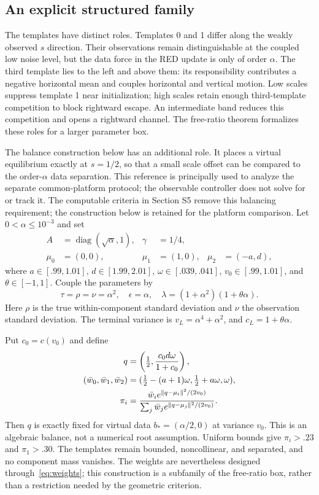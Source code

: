 \subsection{An explicit structured family}
The templates have distinct roles. Templates 0 and 1 differ along the weakly observed $s$ direction. Their observations remain distinguishable at the coupled low noise level, but the data force in the RED update is only of order $\alpha$. The third template lies to the left and above them: its responsibility contributes a negative horizontal mean and couples horizontal and vertical motion. Low scales suppress template 1 near initialization; high scales retain enough third-template competition to block rightward escape. An intermediate band reduces this competition and opens a rightward channel. The free-ratio theorem formalizes these roles for a larger parameter box.

The balance construction below has an additional role. It places a virtual equilibrium exactly at $s=1/2$, so that a small scale offset can be compared to the order-$\alpha$ data separation. This reference is principally used to analyze the separate common-platform protocol; the observable controller does not solve for or track it. The computable criteria in Section S5 remove this balancing requirement; the construction below is retained for the platform comparison.
Let $0<\alpha\le10^{-3}$ and set
\begin{align}
A&=\operatorname{diag}(\sqrt\alpha,1),&\gamma&=1/4,\\
\mu_0&=(0,0),&\mu_1&=(1,0),&\mu_2&=(-a,d),
\end{align}
where $a\in[.99,1.01]$, $d\in[1.99,2.01]$, $\omega\in[.039,.041]$, $v_0\in[.99,1.01]$, and $\theta\in[-1,1]$. Couple the parameters by
\begin{equation}\label{eq:coupling}
\tau=\rho=\nu=\alpha^2,\quad\epsilon=\alpha,\quad
\lambda=(1+\alpha^2)(1+\theta\alpha).
\end{equation}
Here $\rho$ is the true within-component standard deviation and $\nu$ the observation standard deviation. The terminal variance is $v_L=\alpha^4+\alpha^2$, and $c_L=1+\theta\alpha$.

Put $c_0=c(v_0)$ and define
\begin{align}
q&=\left(\tfrac12,\frac{c_0d\omega}{1+c_0}\right),\\
(\bar w_0,\bar w_1,\bar w_2)&=(\tfrac12-(a+1)\omega,\tfrac12+a\omega,\omega),\\
\pi_i&=\frac{\bar w_i e^{\lVert q-\mu_i\rVert^2/(2v_0)}}{\sum_j\bar w_j e^{\lVert q-\mu_j\rVert^2/(2v_0)}}.\label{eq:weights}
\end{align}
Then $q$ is exactly fixed for virtual data $b_*=(\alpha/2,0)$ at variance $v_0$. This is an algebraic balance, not a numerical root assumption. Uniform bounds give $\pi_i>.23$ and $\pi_1>.30$. The templates remain bounded, noncollinear, and separated, and no component mass vanishes. The weights are nevertheless designed through~\eqref{eq:weights}; this construction is a subfamily of the free-ratio box, rather than a restriction needed by the geometric criterion.
